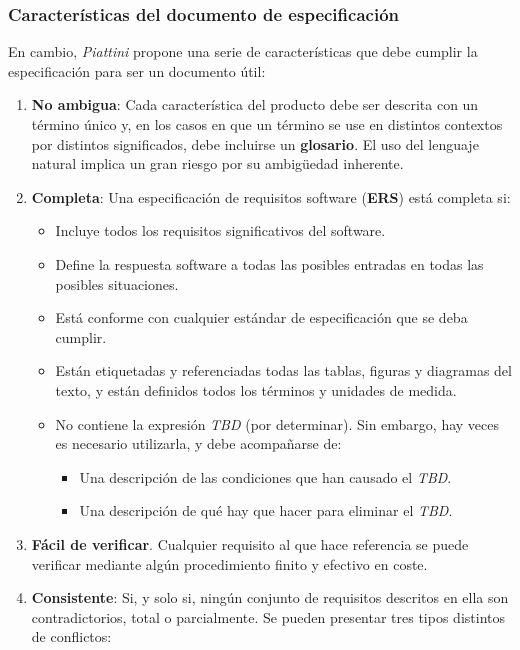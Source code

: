 \subsubsection{Características del documento de especificación}

En cambio, \textit{Piattini} propone una serie de características que debe cumplir la especificación para ser un documento útil:

\begin{enumerate}
    \item \textbf{No ambigua}: Cada característica del producto debe ser descrita con un término único y, en los casos en que un término se use en distintos contextos por distintos significados, debe incluirse un \textbf{glosario}. El uso del lenguaje natural implica un gran riesgo por su ambigüedad inherente.
    \item \textbf{Completa}: Una especificación de requisitos software (\textbf{ERS}) está completa si:
          \begin{itemize}
              \item Incluye todos los requisitos significativos del software.
              \item Define la respuesta software a todas las posibles entradas en todas las posibles situaciones.
              \item Está conforme con cualquier estándar de especificación que se deba cumplir.
              \item Están etiquetadas y referenciadas todas las tablas, figuras y diagramas del texto, y están definidos todos los términos y unidades de medida.
              \item No contiene la expresión \textit{TBD} (por determinar). Sin embargo, hay veces es necesario utilizarla, y debe acompañarse de:
                    \begin{itemize}
                        \item Una descripción de las condiciones que han causado el \textit{TBD}.
                        \item Una descripción de qué hay que hacer para eliminar el \textit{TBD}.
                    \end{itemize}
          \end{itemize}
    \item \textbf{Fácil de verificar}. Cualquier requisito al que hace referencia se puede verificar mediante algún procedimiento finito y efectivo en coste.
    \item \textbf{Consistente}: Si, y solo si, ningún conjunto de requisitos descritos en ella son contradictorios, total o parcialmente. Se pueden presentar tres tipos distintos de conflictos:

\end{enumerate}
